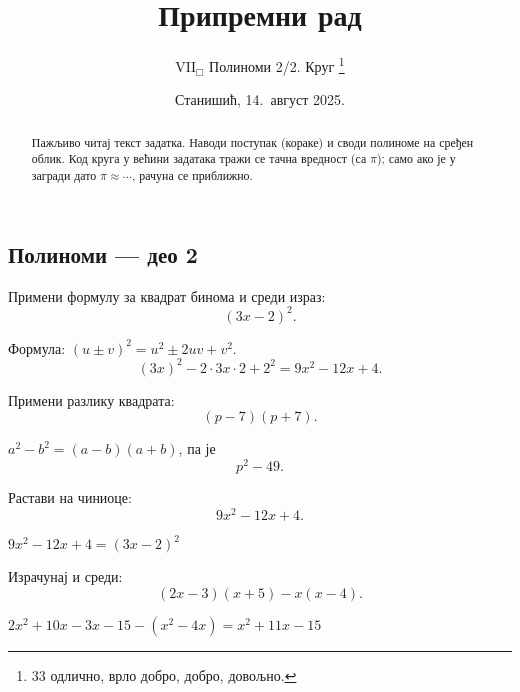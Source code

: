 \documentclass[11pt,a5paper,twoside,addpoints,noanswers]{exam} %
\title{Припремни рад}
\author{$\mathrm{VII}_\Box$ Полиноми 2/2. Круг
  \thanks{33 одлично,\; 25 врло добро,\; 17 добро,\; 9 довољно.}
}
\date{Станишић, 14.\ август 2025.}
\newcommand{\variant}[3]{#1}
\begin{document}
\maketitle
\thispagestyle{headandfoot}

\ifprintanswers\else
\begin{flushleft}\scriptsize
\gradetable[h]
%
\end{flushleft}

\begin{abstract}
Пажљиво читај текст задатка. Наводи поступак (кораке) и своди полиноме на сређен облик.
Код круга у већини задатака тражи се тачна вредност (са $\pi$); само ако је у загради дато $\pi\approx\cdots$, рачуна се приближно.
\end{abstract}
\fi

\begin{questions}

\ifprintanswers\else\section*{Полиноми — део 2}\fi

\question[3]
Примени формулу за квадрат бинома и среди израз:
\[
\variant{(3x-2)^2}{(2a+5)^2}{(4y-1)^2}.
\]
\begin{solution}[\stretch 2]
Формула: $(u\pm v)^2=u^2\pm 2uv+v^2$.
\[
\variant{
(3x)^2-2\cdot 3x\cdot 2+2^2=9x^2-12x+4
}{
(2a)^2+2\cdot 2a\cdot 5+5^2=4a^2+20a+25
}{
(4y)^2-2\cdot 4y\cdot 1+1^2=16y^2-8y+1}.
\]
\end{solution}

\question[2]
Примени разлику квадрата:
\[
\variant{(p-7)(p+7)}{(6x-5)(6x+5)}{(m-3n)(m+3n)}.
\]
\begin{solution}[\stretch 1]
$a^2-b^2=(a-b)(a+b)$, па је
\[
\variant{p^2-49}{36x^2-25}{m^2-9n^2}.
\]
\end{solution}

\ifprintanswers\else\newpage\fi

\question[3]
Растави на чиниоце:
\[
\variant{9x^2-12x+4}{25a^2-1}{8y^2+12y}.
\]
\begin{solution}[\stretch 2]
\variant{
$9x^2-12x+4=(3x-2)^2$
}{
$25a^2-1=(5a-1)(5a+1)$
}{
$8y^2+12y=4y(2y+3)$.
}
\end{solution}

\question[4]
Израчунај и среди:
\[
\variant{
(2x-3)(x+5)-x(x-4)
}{
(3a+2)(a-1)+ (a-4)(a+4)
}{
(5y-1)(y-2)- (2y-3)^2
}.
\]
\begin{solution}[\stretch 3]
\variant{
$2x^2+10x-3x-15-(x^2-4x)=
x^2+11x-15$
}{
$3a^2-3a+2a-2 + (a^2-16)=4a^2-a-18$
}{
$5y^2-10y -y+2 -\big(4y^2-12y+9\big)
= y^2+1y-7$.
}
\end{solution}


\end{questions}
\end{document}
